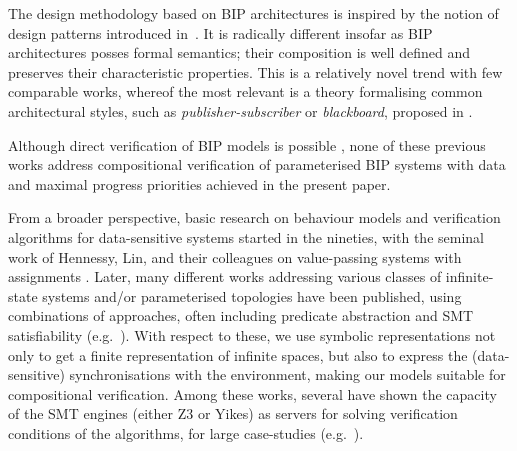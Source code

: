 \documentclass{llncs}
\newcommand{\eg}[1][\ ]{e.g.#1}
\begin{document}



The design methodology based on BIP architectures
is inspired by the notion of design patterns introduced
in~\cite{gamma94-patterns}.  It is radically different
insofar as BIP architectures posses formal semantics; their
composition is well defined and preserves their characteristic
properties.  This is a relatively novel trend with few comparable
works, whereof the most relevant is a theory formalising common
architectural styles, such as \emph{publisher-subscriber} or
\emph{blackboard}, proposed in \cite{Marmsoler14,Marmsoler18}.

Although direct verification of BIP models is possible
\cite{Lacra15,DFinder,DFinder2,atva15,wang2015verification}, none of
these previous works address
compositional verification of parameterised BIP systems with data
and maximal progress priorities achieved in the present paper.

From a broader perspective,
basic research on behaviour models and verification algorithms for
data-sensitive systems started in the nineties, with the seminal work
of Hennessy, Lin, and their colleagues on value-passing systems with
assignments
\cite{HennessyL1995:353,CONCUR::Lin1996,APSEC::Lin2001}. Later, many
different works addressing various classes of infinite-state systems
and/or parameterised topologies have been published, using
combinations of approaches, often including predicate abstraction and
SMT satisfiability (\eg \cite{DBLP:journals/jsat/AlbertiGPRR12,BruniEtAl-Tiles-Concur2000,CimattiEtAl-NUXMV-CAV2014,ChampionEtAl-Kind2-CAV2016,DBLP:conf/cade/GhilardiNRZ08}). With
respect to these, we use symbolic representations not only to get a
finite representation of infinite spaces, but also to express the
(data-sensitive) synchronisations with the environment, making our
models suitable for compositional verification.
Among these works, several have shown the capacity of the SMT engines
(either Z3 or Yikes) as servers for solving verification conditions of
the algorithms, for large case-studies
(\eg \cite{DBLP:journals/corr/abs-1806-11459,DBLP:journals/corr/CimattiGMT13}). %

\end{document}
